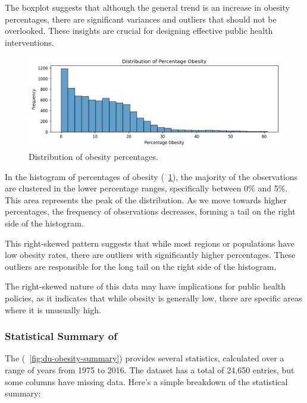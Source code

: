            The boxplot suggests that although the general trend is an increase in obesity percentages, there are significant variances and outliers that should not be overlooked. These insights are crucial for designing effective public health interventions.

            \begin{figure}[H]
                \centering
                \includegraphics[scale=0.8]{images/du_obesity_pe_ob_freq}
                \caption{Distribution of obesity percentages.}
                \label{fig:du-obesity-per-obe-distribution}
            \end{figure}

            In the histogram of percentages of obesity (\figurename~\ref{fig:du-obesity-per-obe-distribution}), the majority of the observations are clustered in the lower percentage ranges, specifically between 0\% and 5\%. This area represents the peak of the distribution. As we move towards higher percentages, the frequency of observations decreases, forming a tail on the right side of the histogram.

            This right-skewed pattern suggests that while most regions or populations have low obesity rates, there are outliers with significantly higher percentages. These outliers are responsible for the long tail on the right side of the histogram.

            The right-skewed nature of this data may have implications for public health policies, as it indicates that while obesity is generally low, there are specific areas where it is unusually high.

            \subsubsection{Statistical Summary of {\dsObesity}}

                The \textit{\dsObesity} (\figurename~\ref{fig:du-obesity-summary}) provides several statistics, calculated over a range of years from 1975 to 2016. The dataset has a total of 24,650 entries, but some columns have missing data. Here's a simple breakdown of the statistical summary:

